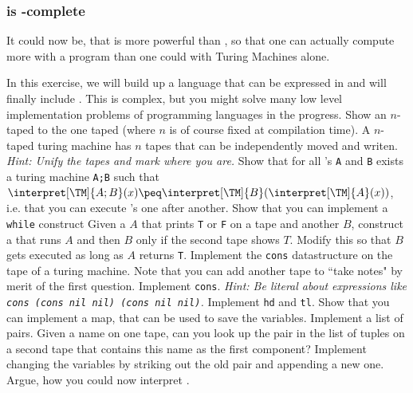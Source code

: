 \subsubsection{\TM  is \WHILE-complete}
It could now be, that \WHILE is more powerful than \TM, so that one can 
actually compute more with a \WHILE program than one could with Turing 
Machines alone.

\begin{Exercise}[title={Interpreter for \WHILE in \TM},difficulty=4]
	In this exercise, we will build up a language that can be expressed in \TM 
	and will finally include \WHILE. This is complex, but you might solve 
	many low level implementation problems of programming languages in the progress.
	\Question Show an $n$-taped \TM to the one taped (where $n$ is of course fixed at
		compilation time). A $n$-taped turing machine has $n$ tapes that can be 
		independently moved and writen. {\em Hint: Unify the tapes and mark where 
		you are.}
	\Question Show that for all \TM's {\tt A} and {\tt B} exists a turing 
			machine {\tt A;B} such that $\interpret[\TM]{A;B}(x) \peq
			\interpret[\TM]{B}(\interpret[\TM]{A}(x))$, i.e. that you can execute
			\TM's one after another.  
	\Question Show that you can implement a {\tt while} construct
		\subQuestion Given a \TM $A$ that prints {\tt T} or {\tt F} on a tape and 
			another \TM $B$, construct a  that runs $A$ 
			and then $B$ only if the second tape shows $T$.
		\subQuestion Modify this so that $B$ gets executed as long as $A$ returns {\tt T}.
	\Question Implement the {\tt cons} datastructure on the tape of a turing 
	machine. Note that you can add another tape to ``take notes" by merit of the first question.
		\subQuestion Implement {\tt cons}. {\em Hint: Be literal about 
		expressions like {\tt cons (cons nil nil) (cons nil nil)}.} 
		\subQuestion Implement {\tt hd} and {\tt tl}.
	\Question Show that you can implement a map, that can be used to save the variables.
		\subQuestion Implement a list of pairs.
		\subQuestion Given a name on one tape, can you look up the pair in the 
			list of tuples on a second tape that contains this name as the first
			component?
		\subQuestion Implement changing the variables by striking out the old 
			pair and appending a new one.
	\Question Argue, how you could now interpret \WHILE.
\end{Exercise}
